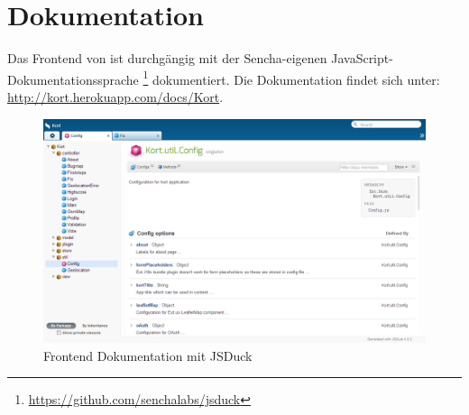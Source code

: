 \section{Dokumentation}

Das Frontend von \kort{} ist durchgängig mit der Sencha-eigenen JavaScript-Dokumentationssprache \footnote{\url{https://github.com/senchalabs/jsduck}} dokumentiert.
Die Dokumentation findet sich unter: \url{http://kort.herokuapp.com/docs/Kort}.

\begin{figure}[H]
	\centering
	\includegraphics[width=\textwidth]{images/implementation/frontend/kort-documentation}
	\caption{Frontend Dokumentation mit JSDuck}
	\label{image-kort-documentation}
\end{figure}